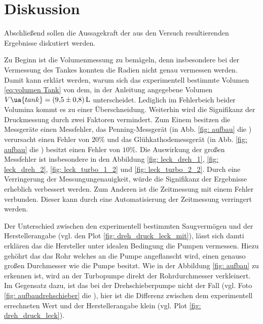 \section{Diskussion}

Abschließend sollen die Aussagekraft der aus den Versuch resultierenden Ergebnisse diskutiert werden.

Zu Beginn ist die Volumenmessung zu bemägeln, denn insbesondere bei der Vermessung des Tankes
konnten die Radien nicht genau vermessen werden. Damit kann erklärt werden, warum sich das experimentell
bestimmte Volumen \eqref{eq:volumen Tank} von dem, in der Anleitung \cite{} angegebene Volumen
$V\ua{tank}=\SI{9.5\pm0,8}{\litre}$ unterscheidet. Lediglich im Fehlerbeich beider Volumina
kommt es zu einer Überschneidung.
Weiterhin wird die Signifikanz der Druckmessung durch zwei Faktoren vermindert.
Zum Einem besitzen die Messgeräte einen Messfehler, das Penning-Messgerät (in Abb. \ref{fig: aufbau} die ) verursacht einen Fehler von $20\%$ und das
Glühkathodemessgerät (in Abb. \ref{fig: aufbau} die ) besitzt einen Fehler von $10\%$. Die Auswirkung der großen Messfehler
ist insbesondere in den Abbildung \ref{fig: leck_dreh_1}, \ref{fig: leck_dreh_2}, \ref{fig: leck_turbo_1_2} und \ref{fig: leck_turbo_2_2}.
Durch eine Verringerung der Messungungenauigkeit, würde die Signifikanz der Ergebnisse erheblich verbessert werden.
Zum Anderen ist die Zeitmessung mit einem Fehler verbunden. Dieser kann durch eine Automatisierung der Zeitmessung verringert werden.

Der Unterschied zwischen den experimentell bestimmten Saugvermögen und der Herstellerangabe (vgl. den Plot \ref{fig: dreh_druck_leck_mit}),
lässt sich damti erklären das die Hersteller unter idealen Bedingung die Pumpen vermessen. Hiezu gehöhrt das das Rohr welches an die Pumpe angeflanscht wird,
einen genauso großen Durchmesser wie die Pumpe besitzt. Wie in der Abbildung \ref{fig: aufbau} zu erkennen ist, wird an der Turbopumpe  direkt der
Rohrdurchmesser verkleinert. Im Gegensatz dazu, ist das bei der Drehschieberpumpe nicht der Fall (vgl. Foto \ref{fig: aufbaudrehschieber} die ),
hier ist die Differenz zwischen dem experimentell errechneten Wert und der Herstellerangabe klein (vgl. Plot \ref{fig: dreh_druck_leck}).
